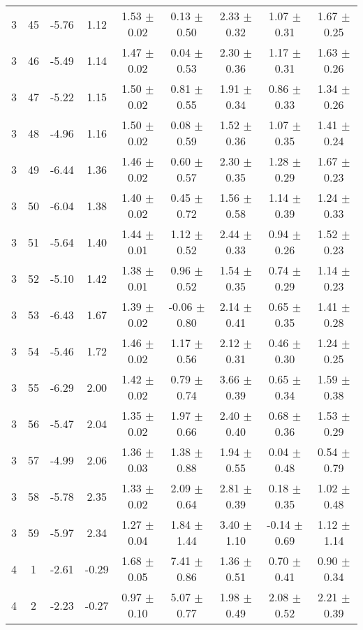 \begin{landscape}
\begin{longtable}{ccccccccc}
   3 & 45 & -5.76 & 1.12 & 1.53 $\pm$ 0.02 & 0.13 $\pm$ 0.50 & 2.33 $\pm$ 0.32 & 1.07 $\pm$ 0.31 & 1.67 $\pm$ 0.25\\
   3 & 46 & -5.49 & 1.14 & 1.47 $\pm$ 0.02 & 0.04 $\pm$ 0.53 & 2.30 $\pm$ 0.36 & 1.17 $\pm$ 0.31 & 1.63 $\pm$ 0.26\\
   3 & 47 & -5.22 & 1.15 & 1.50 $\pm$ 0.02 & 0.81 $\pm$ 0.55 & 1.91 $\pm$ 0.34 & 0.86 $\pm$ 0.33 & 1.34 $\pm$ 0.26\\
   3 & 48 & -4.96 & 1.16 & 1.50 $\pm$ 0.02 & 0.08 $\pm$ 0.59 & 1.52 $\pm$ 0.36 & 1.07 $\pm$ 0.35 & 1.41 $\pm$ 0.24\\
   3 & 49 & -6.44 & 1.36 & 1.46 $\pm$ 0.02 & 0.60 $\pm$ 0.57 & 2.30 $\pm$ 0.35 & 1.28 $\pm$ 0.29 & 1.67 $\pm$ 0.23\\
   3 & 50 & -6.04 & 1.38 & 1.40 $\pm$ 0.02 & 0.45 $\pm$ 0.72 & 1.56 $\pm$ 0.58 & 1.14 $\pm$ 0.39 & 1.24 $\pm$ 0.33\\
   3 & 51 & -5.64 & 1.40 & 1.44 $\pm$ 0.01 & 1.12 $\pm$ 0.52 & 2.44 $\pm$ 0.33 & 0.94 $\pm$ 0.26 & 1.52 $\pm$ 0.23\\
   3 & 52 & -5.10 & 1.42 & 1.38 $\pm$ 0.01 & 0.96 $\pm$ 0.52 & 1.54 $\pm$ 0.35 & 0.74 $\pm$ 0.29 & 1.14 $\pm$ 0.23\\
   3 & 53 & -6.43 & 1.67 & 1.39 $\pm$ 0.02 & -0.06 $\pm$ 0.80 & 2.14 $\pm$ 0.41 & 0.65 $\pm$ 0.35 & 1.41 $\pm$ 0.28\\
   3 & 54 & -5.46 & 1.72 & 1.46 $\pm$ 0.02 & 1.17 $\pm$ 0.56 & 2.12 $\pm$ 0.31 & 0.46 $\pm$ 0.30 & 1.24 $\pm$ 0.25\\
   3 & 55 & -6.29 & 2.00 & 1.42 $\pm$ 0.02 & 0.79 $\pm$ 0.74 & 3.66 $\pm$ 0.39 & 0.65 $\pm$ 0.34 & 1.59 $\pm$ 0.38\\
   3 & 56 & -5.47 & 2.04 & 1.35 $\pm$ 0.02 & 1.97 $\pm$ 0.66 & 2.40 $\pm$ 0.40 & 0.68 $\pm$ 0.36 & 1.53 $\pm$ 0.29\\
   3 & 57 & -4.99 & 2.06 & 1.36 $\pm$ 0.03 & 1.38 $\pm$ 0.88 & 1.94 $\pm$ 0.55 & 0.04 $\pm$ 0.48 & 0.54 $\pm$ 0.79\\
   3 & 58 & -5.78 & 2.35 & 1.33 $\pm$ 0.02 & 2.09 $\pm$ 0.64 & 2.81 $\pm$ 0.39 & 0.18 $\pm$ 0.35 & 1.02 $\pm$ 0.48\\
   3 & 59 & -5.97 & 2.34 & 1.27 $\pm$ 0.04 & 1.84 $\pm$ 1.44 & 3.40 $\pm$ 1.10 & -0.14 $\pm$ 0.69 & 1.12 $\pm$ 1.14\\
 4 &  1 & -2.61 & -0.29 & 1.68 $\pm$ 0.05 & 7.41 $\pm$ 0.86 & 1.36 $\pm$ 0.51 & 0.70 $\pm$ 0.41 & 0.90 $\pm$ 0.34\\
 4 &  2 & -2.23 & -0.27 & 0.97 $\pm$ 0.10 & 5.07 $\pm$ 0.77 & 1.98 $\pm$ 0.49 & 2.08 $\pm$ 0.52 & 2.21 $\pm$ 0.39\\

\end{longtable}
\end{landscape}
